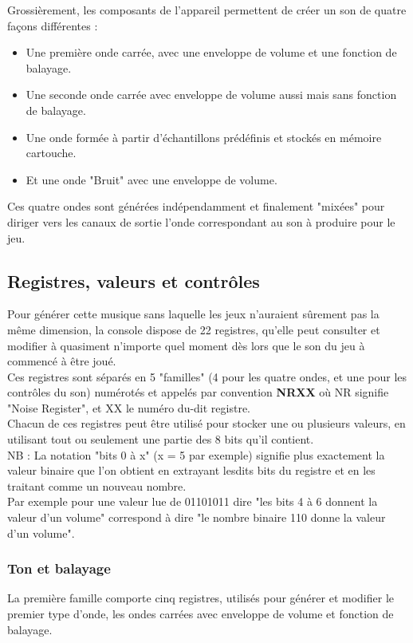 \documentclass{report}
\begin{document}
	Grossièrement, les composants de l'appareil permettent de
	créer un son de quatre façons différentes : 
		\begin{itemize}
		\item Une première onde carrée, avec une enveloppe de
		volume et une fonction de balayage.
		\item Une seconde onde carrée avec enveloppe de volume
		aussi mais sans fonction de balayage.
		\item Une onde formée à partir d'échantillons
		prédéfinis et stockés en mémoire cartouche.
		\item Et une onde "Bruit" avec une enveloppe de
		volume.
		\end{itemize}
	Ces quatre ondes sont générées indépendamment et finalement
	"mixées" pour diriger vers les canaux de sortie l'onde
	correspondant au son à produire pour le jeu.

\subsection{Registres, valeurs et contrôles} 
	Pour générer cette musique sans laquelle les jeux n'auraient
	sûrement pas la même dimension, la console dispose de 22
	registres, qu'elle peut consulter et modifier à quasiment
	n'importe quel moment dès lors que le son du jeu à commencé à
	être joué.\\
	Ces registres sont séparés en 5 "familles" (4 pour les quatre
	ondes, et une pour les contrôles du son) numérotés et appelés
	par convention \textbf{NRXX} où NR signifie "Noise Register", et XX le
	numéro du-dit registre. \\
	Chacun de ces registres peut être utilisé pour stocker une
	ou plusieurs valeurs, en utilisant tout ou seulement une
	partie des 8 bits qu'il contient.\\

	NB : La notation "bits 0 à x" (x = 5 par exemple) signifie
	plus exactement la valeur binaire que l'on obtient en
	extrayant lesdits bits du registre et en les traitant comme un
	nouveau nombre.\\
	Par exemple pour une valeur lue de 01101011 dire "les bits 4 à
	6 donnent la valeur d'un volume" correspond à dire "le nombre binaire
	110 donne la valeur d'un volume".

	\subsubsection{Ton et balayage}
	La première famille comporte cinq registres, utilisés pour
	générer et modifier le premier type d'onde, les ondes carrées
	avec enveloppe de volume et fonction de balayage.\\
\end{document}
